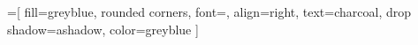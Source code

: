 \newcommand{\denote}[1]{\left\llbracket#1\right\rrbracket}


\newcommand{\inputMinted}[2]{

}



\newlength{\dist}
\setlength{\dist}{1cm}

\newlength{\edge}
\setlength{\edge}{1.5cm}

\newlength{\longedge}
\setlength{\longedge}{1.7cm}

\newlength{\nd}
\setlength{\nd}{.6cm}

\newlength{\ndd}
\setlength{\ndd}{.5cm}

\newtheorem{sublemma}[theorem]{Sub-Lemma}
\let\oldexample\example
\renewcommand{\example}{\oldexample\normalfont}

\tikzset{>=latex,on grid, auto}

=[
  fill=greyblue,
  rounded corners,
  font=\small,
  align=right,
  text=charcoal,
  drop shadow={ashadow, color=greyblue}
]

\newcommand{\backEq}{\mathcal U^\equiv}
\newcommand{\backCC}{\mathcal U^\Subset}
\newcommand{\transEq}{\mathcal T^\equiv}
\newcommand{\transCC}{\mathcal T^\Subset}

\newcommand{\rcc}{{R^\Subset}}
\newcommand{\lcc}{L^\Subset}

